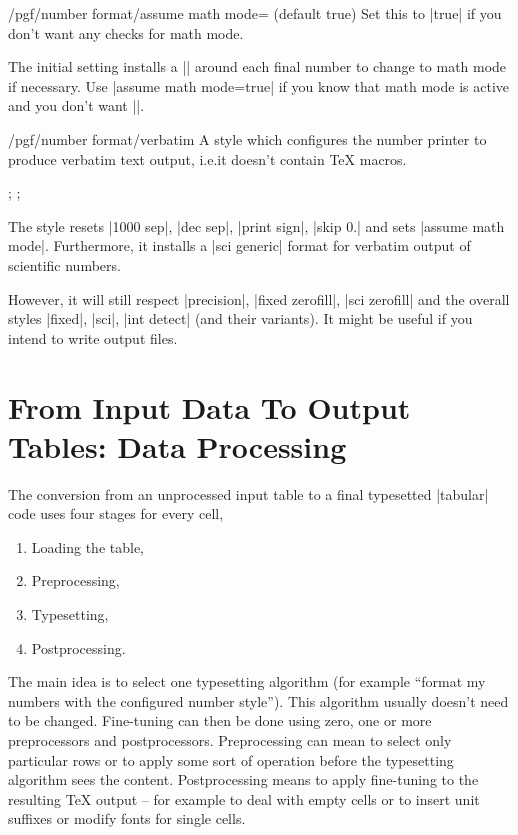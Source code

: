 \documentclass[a4paper]{ltxdoc}
\begin{document}
\begin{key}{/pgf/number format/assume math mode= (default true)}
    Set this to |true| if you don't want any checks for math mode.

    The initial setting installs a |\pgfutilensuremath| around each final
    number to change to math mode if necessary. Use |assume math mode=true| if
    you know that math mode is active and you don't want |\pgfutilensuremath|.
\end{key}

\begin{stylekey}{/pgf/number format/verbatim}
    A style which configures the number printer to produce verbatim text
    output, i.e.\@ it doesn't contain \TeX{} macros.
\begin{codeexample}[]
;
;
\pgfmathprintnumber{\pgfmathresult}
\end{codeexample}
    The style resets |1000 sep|, |dec sep|, |print sign|, |skip 0.| and sets
    |assume math mode|. Furthermore, it installs a |sci generic| format for
    verbatim output of scientific numbers.

    However, it will still respect |precision|, |fixed zerofill|,
    |sci zerofill| and the overall styles |fixed|, |sci|, |int detect| (and
    their variants). It might be useful if you intend to write output files.
\end{stylekey}


\section{From Input Data To Output Tables: Data Processing}
\label{sec:data:processing}

The conversion from an unprocessed input table to a final typesetted |tabular|
code uses four stages for every cell,
%
\begin{enumerate}
    \item Loading the table,
    \item Preprocessing,
    \item Typesetting,
    \item Postprocessing.
\end{enumerate}
%
The main idea is to select one typesetting algorithm (for example ``format my
numbers with the configured number style''). This algorithm usually doesn't
need to be changed. Fine-tuning can then be done using zero, one or more
preprocessors and postprocessors. Preprocessing can mean to select only
particular rows or to apply some sort of operation before the typesetting
algorithm sees the content. Postprocessing means to apply fine-tuning to the
resulting \TeX{} output -- for example to deal with empty cells or to insert
unit suffixes or modify fonts for single cells.
\end{document}

